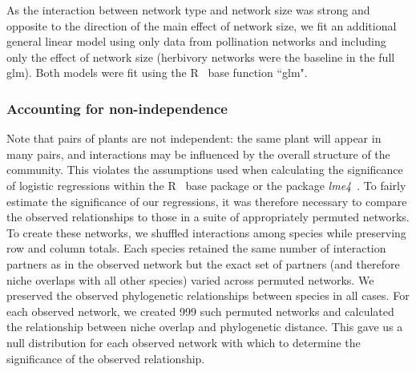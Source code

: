 \documentclass[12pt]{article}
\begin{document}
\begin{spacing}{1.5}
    As the interaction between network type and network size was strong and opposite to the direction of the main effect of network size, we fit an additional general linear model using only data from pollination networks and including only the effect of network size (herbivory networks were the baseline in the full glm). Both models were fit using the R~\citep{R} base function ``glm".


    \subsubsection*{Accounting for non-independence}

      Note that pairs of plants are not independent: the same plant will 
      appear in many pairs, and interactions may be influenced by the 
      overall structure of the community. This violates the assumptions used 
      when calculating the significance of logistic regressions within 
      the R~\citep{R} base package or the package \emph{lme4}~\citep{lme4}. To 
      fairly estimate the significance of our regressions, it was 
      therefore necessary to compare the observed relationships to those in a 
      suite of appropriately permuted networks. To create these networks, we 
      shuffled interactions among species while preserving row and column 
      totals. Each species retained the same number of interaction 
      partners as in the observed network but the exact set of partners (and 
      therefore niche overlaps with all other species) varied across permuted 
      networks. We preserved the observed phylogenetic relationships between 
      species in all cases. For each observed network, we created 999 such 
      permuted networks and calculated the relationship between niche overlap 
      and phylogenetic distance. This gave us a null distribution for each 
      observed network with which to determine the significance of the observed 
      relationship.



\end{spacing}
\end{document}
